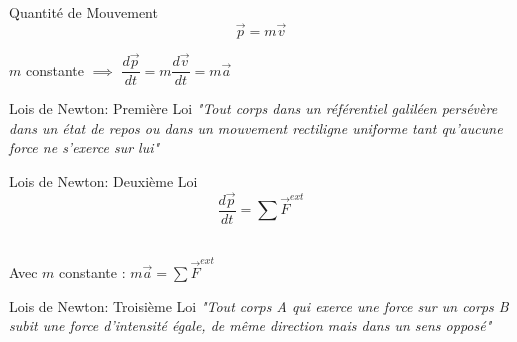 \documentclass[xcolor=table]{beamer}
\begin{document}
\begin{frame}{Quantité de Mouvement}
 \[\vec{p}=m\vec{v}\]
\begin{center}
    $m$ constante $\implies$ $\dfrac{d\vec{p}}{dt}=m \dfrac{d\vec{v}}{dt}=m\vec{a}$
\end{center} 

\end{frame}

\begin{frame}{Lois de Newton: Première Loi}
    \textit{ "Tout corps dans un référentiel galiléen persévère dans un état de repos ou dans un mouvement rectiligne uniforme tant qu'aucune force ne s'exerce sur lui"}
\end{frame}

\begin{frame}{Lois de Newton: Deuxième Loi}
    \begin{equation*}
    \dfrac{d\vec p}{dt}=\sum \vec {F}^{ext}
\end{equation*}\\
\par\leavevmode\par
\par\leavevmode\par
Avec $m$ constante : $m\vec{a}=\sum \vec{F}^{ext}$
\end{frame}

\begin{frame}{Lois de Newton: Troisième Loi}
    \textit{"Tout corps A qui exerce une force sur un corps B subit une force d'intensité égale, de même direction mais dans un sens opposé"}
\end{frame}
\end{document}
